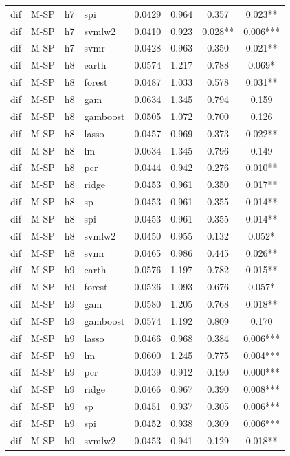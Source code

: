 \begin{ThreePartTable}
\begin{longtable}[t]{llclcccc}
dif & M-SP & h7 & spi & 0.0429 & 0.964 & 0.357 & 0.023**\\
dif & M-SP & h7 & svmlw2 & 0.0410 & 0.923 & 0.028** & 0.006***\\
dif & M-SP & h7 & svmr & 0.0428 & 0.963 & 0.350 & 0.021**\\
\addlinespace
dif & M-SP & h8 & earth & 0.0574 & 1.217 & 0.788 & 0.069*\\
dif & M-SP & h8 & forest & 0.0487 & 1.033 & 0.578 & 0.031**\\
dif & M-SP & h8 & gam & 0.0634 & 1.345 & 0.794 & 0.159\\
dif & M-SP & h8 & gamboost & 0.0505 & 1.072 & 0.700 & 0.126\\
dif & M-SP & h8 & lasso & 0.0457 & 0.969 & 0.373 & 0.022**\\
dif & M-SP & h8 & lm & 0.0634 & 1.345 & 0.796 & 0.149\\
dif & M-SP & h8 & pcr & 0.0444 & 0.942 & 0.276 & 0.010**\\
dif & M-SP & h8 & ridge & 0.0453 & 0.961 & 0.350 & 0.017**\\
dif & M-SP & h8 & sp & 0.0453 & 0.961 & 0.355 & 0.014**\\
dif & M-SP & h8 & spi & 0.0453 & 0.961 & 0.355 & 0.014**\\
dif & M-SP & h8 & svmlw2 & 0.0450 & 0.955 & 0.132 & 0.052*\\
dif & M-SP & h8 & svmr & 0.0465 & 0.986 & 0.445 & 0.026**\\
\addlinespace
dif & M-SP & h9 & earth & 0.0576 & 1.197 & 0.782 & 0.015**\\
dif & M-SP & h9 & forest & 0.0526 & 1.093 & 0.676 & 0.057*\\
dif & M-SP & h9 & gam & 0.0580 & 1.205 & 0.768 & 0.018**\\
dif & M-SP & h9 & gamboost & 0.0574 & 1.192 & 0.809 & 0.170\\
dif & M-SP & h9 & lasso & 0.0466 & 0.968 & 0.384 & 0.006***\\
dif & M-SP & h9 & lm & 0.0600 & 1.245 & 0.775 & 0.004***\\
dif & M-SP & h9 & pcr & 0.0439 & 0.912 & 0.190 & 0.000***\\
dif & M-SP & h9 & ridge & 0.0466 & 0.967 & 0.390 & 0.008***\\
dif & M-SP & h9 & sp & 0.0451 & 0.937 & 0.305 & 0.006***\\
dif & M-SP & h9 & spi & 0.0452 & 0.938 & 0.309 & 0.006***\\
dif & M-SP & h9 & svmlw2 & 0.0453 & 0.941 & 0.129 & 0.018**\\

\end{longtable}
\end{ThreePartTable}
